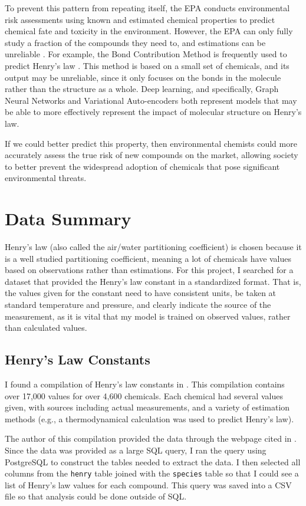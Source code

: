 \documentclass[12pt, oneside]{article}   	%
\begin{document}
To prevent this pattern from repeating itself, the EPA conducts environmental risk assessments using known and estimated chemical properties to predict chemical fate and toxicity in the environment. However, the EPA can only fully study a fraction of the compounds they need to, and estimations can be unreliable \cite{burton}. For example, the Bond Contribution Method is frequently used to predict Henry's law \cite{meylan}. This method is based on a small set of chemicals, and its output may be unreliable, since it only focuses on the bonds in the molecule rather than the structure as a whole. Deep learning, and specifically, Graph Neural Networks and Variational Auto-encoders both represent models that may be able to more effectively represent the impact of molecular structure on Henry's law.

If we could better predict this property, then environmental chemists could more accurately assess the true risk of new compounds on the market, allowing society to better prevent the widespread adoption of chemicals that pose significant environmental threats.

\section{Data Summary}
Henry's law (also called the air/water partitioning coefficient) is chosen because it is a well studied partitioning coefficient, meaning a lot of chemicals have values based on observations rather than estimations. For this project, I searched for a dataset that provided the Henry's law constant in a standardized format. That is, the values given for the constant need to have consistent units, be taken at standard temperature and pressure, and clearly indicate the source of the measurement, as it is vital that my model is trained on observed values, rather than calculated values. 

\subsection{Henry's Law Constants}
I found a compilation of Henry's law constants in \cite{sander2015}. This compilation contains over 17,000 values for over 4,600 chemicals. Each chemical had several values given, with sources including actual measurements, and a variety of estimation methods (e.g., a thermodynamical calculation was used to predict Henry's law). 

The author of this compilation provided the data through the webpage cited in \cite{sander-website}. Since the data was provided as a large SQL query, I ran the query using PostgreSQL to construct the tables needed to extract the data. I then selected all columns from  the \texttt{henry} table joined with the \texttt{species} table so that I could see a list of Henry's law values for each compound. This query was saved into a CSV file so that analysis could be done outside of SQL.
\end{document}
